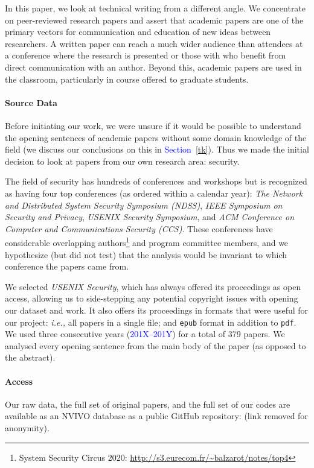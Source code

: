 \documentclass[sigconf,anonymous]{acmart}
\newcommand{\ie}{\textit{i.e.,}\xspace}
\newcommand{\textblue}[1]{\textcolor{blue}{#1}}
\begin{document}
In this paper, we look at technical writing from a different angle. We concentrate on peer-reviewed research papers and assert that academic papers are one of the primary vectors for communication and education of new ideas between researchers. A written paper can reach a much wider audience than attendees at a conference where the research is presented or those with who benefit from direct communication with an author. Beyond this, academic papers are used in the classroom, particularly in course offered to graduate students. 
	
\paragraph{Source Data} Before initiating our work, we were unsure if it would be possible to understand the opening sentences of academic papers without some domain knowledge of the field (we discuss our conclusions on this in \textblue{Section~\ref{tk}}). Thus we made the initial decision to look at papers from our own research area: security. 

The field of security has hundreds of conferences and workshops but is recognized as having four top conferences (as ordered within a calendar year): \textit{The Network and Distributed System Security Symposium (NDSS)}, \textit{IEEE Symposium on Security and Privacy}, \textit{USENIX Security Symposium}, and \textit{ACM Conference on Computer and Communications Security (CCS)}. These conferences have considerable overlapping authors\footnote{System Security Circus 2020: \url{http://s3.eurecom.fr/~balzarot/notes/top4}} and program committee members, and we hypothesize (but did not test) that the analysis would be invariant to which conference the papers came from.

We selected \textit{USENIX Security}, which has always offered its proceedings as open access, allowing us to side-stepping any potential copyright issues with opening our dataset and work. It also offers its proceedings in formats that were useful for our project: \ie all papers in a single file; and \texttt{epub} format in addition to \texttt{pdf}. We used three consecutive years (\textblue{201X--201Y}) for a total of 379 papers. We analysed every opening sentence from the main body of the paper (as opposed to the abstract).
	
\paragraph{Access} Our raw data, the full set of original papers, and the full set of our codes are available as an NVIVO database as a public GitHub repository: (link removed for anonymity). 
	
\end{document}
